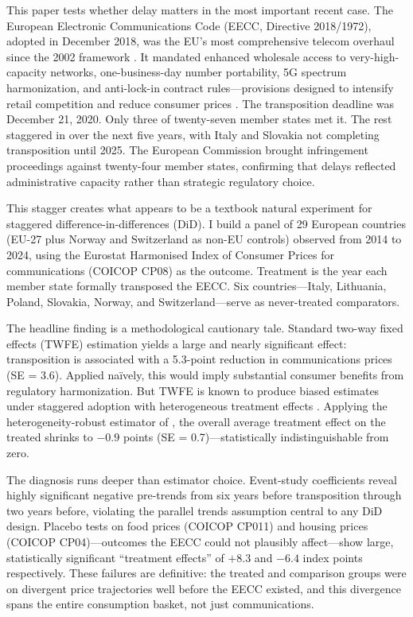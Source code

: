 \documentclass[12pt]{article}
\begin{document}
This paper tests whether delay matters in the most important recent case. The European Electronic Communications Code (EECC, Directive 2018/1972), adopted in December 2018, was the EU's most comprehensive telecom overhaul since the 2002 framework \citep{cave2019european}. It mandated enhanced wholesale access to very-high-capacity networks, one-business-day number portability, 5G spectrum harmonization, and anti-lock-in contract rules---provisions designed to intensify retail competition and reduce consumer prices \citep{briglauer2017european}. The transposition deadline was December 21, 2020. Only three of twenty-seven member states met it. The rest staggered in over the next five years, with Italy and Slovakia not completing transposition until 2025. The European Commission brought infringement proceedings against twenty-four member states, confirming that delays reflected administrative capacity rather than strategic regulatory choice.

This stagger creates what appears to be a textbook natural experiment for staggered difference-in-differences (DiD). I build a panel of 29 European countries (EU-27 plus Norway and Switzerland as non-EU controls) observed from 2014 to 2024, using the Eurostat Harmonised Index of Consumer Prices for communications (COICOP CP08) as the outcome. Treatment is the year each member state formally transposed the EECC. Six countries---Italy, Lithuania, Poland, Slovakia, Norway, and Switzerland---serve as never-treated comparators.

The headline finding is a methodological cautionary tale. Standard two-way fixed effects (TWFE) estimation yields a large and nearly significant effect: transposition is associated with a 5.3-point reduction in communications prices (SE = 3.6). Applied na\"ively, this would imply substantial consumer benefits from regulatory harmonization. But TWFE is known to produce biased estimates under staggered adoption with heterogeneous treatment effects \citep{goodmanbacon2021, dechaisemartin2020}. Applying the heterogeneity-robust estimator of \citet{callaway2021}, the overall average treatment effect on the treated shrinks to $-0.9$ points (SE = 0.7)---statistically indistinguishable from zero.

The diagnosis runs deeper than estimator choice. Event-study coefficients reveal highly significant negative pre-trends from six years before transposition through two years before, violating the parallel trends assumption central to any DiD design. Placebo tests on food prices (COICOP CP011) and housing prices (COICOP CP04)---outcomes the EECC could not plausibly affect---show large, statistically significant ``treatment effects'' of $+8.3$ and $-6.4$ index points respectively. These failures are definitive: the treated and comparison groups were on divergent price trajectories well before the EECC existed, and this divergence spans the entire consumption basket, not just communications.
\end{document}
